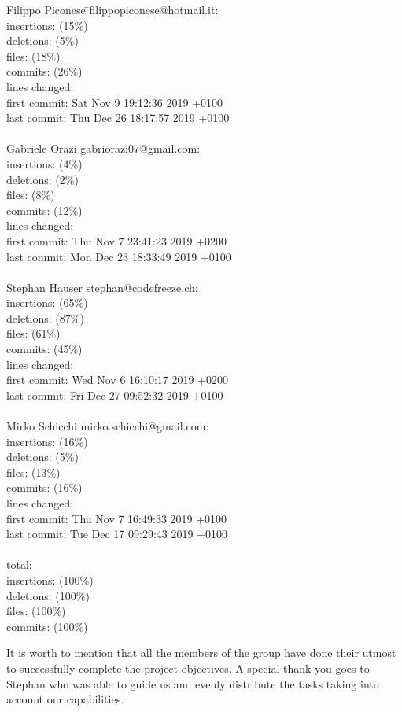 \begin{tabbing}
  Filippo Piconese \= \textlangle{}filippopiconese@hotmail.it\textrangle{}:\\
  insertions:  (15\%)\\
  deletions:  (5\%)\\
  files:  (18\%)\\
  commits:  (26\%)\\
  lines changed: \\
  first commit: \> Sat Nov 9 19:12:36 2019 +0100\\
  last commit: \> Thu Dec 26 18:17:57 2019 +0100\\
  \\
  Gabriele Orazi \> \textlangle{}gabriorazi07@gmail.com\textrangle{}:\\
  insertions:  (4\%)\\
  deletions:  (2\%)\\
  files:  (8\%)\\
  commits:  (12\%)\\
  lines changed: \\
  first commit: \> Thu Nov 7 23:41:23 2019 +0200\\
  last commit: \> Mon Dec 23 18:33:49 2019 +0100\\
  \\
  Stephan Hauser \> \textlangle{}stephan@codefreeze.ch\textrangle{}:\\
  insertions:  (65\%)\\
  deletions:  (87\%)\\
  files:  (61\%)\\
  commits:  (45\%)\\
  lines changed: \\
  first commit: \> Wed Nov 6 16:10:17 2019 +0200\\
  last commit: \> Fri Dec 27 09:52:32 2019 +0100\\
  \\
  Mirko Schicchi \> \textlangle{}mirko.schicchi@gmail.com\textrangle{}:\\
  insertions:  (16\%)\\
  deletions:  (5\%)\\
  files:  (13\%)\\
  commits:  (16\%)\\
  lines changed: \\
  first commit: \> Thu Nov 7 16:49:33 2019 +0100\\
  last commit: \> Tue Dec 17 09:29:43 2019 +0100\\
  \\
  total:\\
  insertions:  (100\%)\\
  deletions:  (100\%)\\
  files:  (100\%)\\
  commits:  (100\%)\\
\end{tabbing}
It is worth to mention that all the members of the group have done their utmost to successfully complete the project objectives.\newline
A special thank you goes to Stephan who was able to guide us and evenly distribute the tasks taking into account our capabilities.
